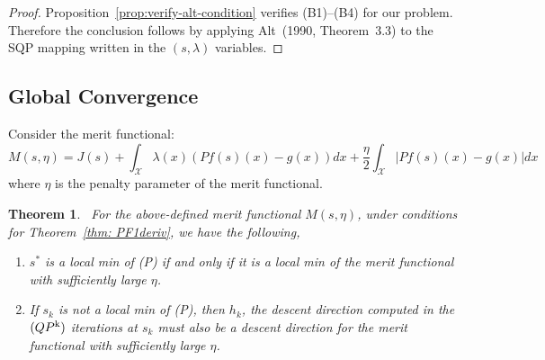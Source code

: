 \documentclass[12pt,leqno]{amsart}
\newtheorem{theorem}{Theorem}
\begin{document}
\begin{proof}
Proposition~\ref{prop:verify-alt-condition} verifies (B1)--(B4) for our problem.
Therefore the conclusion follows by applying Alt~(1990, Theorem~3.3) to the SQP mapping written in the $(s,\lambda)$ variables.
\end{proof}

\subsection{Global Convergence}\label{subsec:glo_conv}
Consider the merit functional:
\[
M(s,\eta)=J(s)+\int_{\mathcal{X}}\lambda(x)(Pf(s)(x)-g(x))dx+\frac{\eta}{2}\int_{\mathcal{X}}|Pf(s)(x)-g(x)|dx
\]
where $\eta$ is the penalty parameter of the merit functional.
\begin{theorem}~\label{thm: Merit} 
    For the above-defined merit functional $M(s,\eta)$, under conditions for Theorem~\ref{thm: PF1deriv}, we have the following,
    \begin{enumerate}
        \item $s^*$ is a local min of (P) if and only if it is a local min of the merit functional with sufficiently large $\eta$.
        \item If $s_k$ is not a local min of (P), then $h_k$, the descent direction computed in the $(QP\textsuperscript{k})$ iterations at $s_k$ must also be a descent direction for the merit functional with sufficiently large $\eta$.
    \end{enumerate}
\end{theorem}
\end{document}
